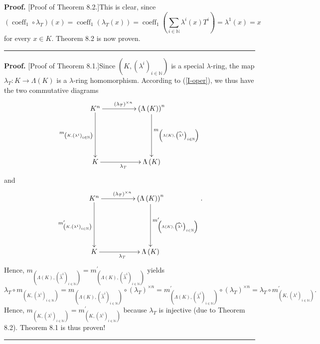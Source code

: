 \documentclass[numbers=enddot,12pt,final,onecolumn,notitlepage]{scrartcl}%
\newenvironment{proof}[1][Proof]{\noindent\textbf{#1.} }{\ \rule{0.5em}{0.5em}}
\begin{document}
\begin{proof}
[Proof of Theorem 8.2.]This is clear, since
\[
\left(  \operatorname*{coeff}\nolimits_{1}\circ\lambda_{T}\right)  \left(
x\right)  =\operatorname*{coeff}\nolimits_{1}\left(  \lambda_{T}\left(
x\right)  \right)  =\operatorname*{coeff}\nolimits_{1}\left(  \sum
\limits_{i\in\mathbb{N}}\lambda^{i}\left(  x\right)  T^{i}\right)
=\lambda^{1}\left(  x\right)  =x
\]
for every $x\in K$. Theorem 8.2 is now proven.
\end{proof}

\begin{proof}
[Proof of Theorem 8.1.]Since $\left(  K,\left(  \lambda^{i}\right)
_{i\in\mathbb{N}}\right)  $ is a special $\lambda$-ring, the map $\lambda
_{T}:K\rightarrow\Lambda\left(  K\right)  $ is a $\lambda$-ring homomorphism.
According to (\ref{I-oper}), we thus have the two commutative diagrams%
\[
\xymatrixrowsep{5pc}\xymatrixcolsep{4pc}\xymatrix{
K^n \ar[r]^{\left(\lambda_T\right)^{\times n}} \ar[d]_{m_{\left(K,\left(\lambda^i\right)_{i\in\mathbb{N}}\right)}} & \left(\Lambda\left(K\right)\right)^n \ar[d]^{m_{\left(\Lambda\left(K\right),\left(\widehat{\lambda}^i\right)_{i\in\mathbb{N}}\right)}} \\
K \ar[r]_{\lambda_T} & \Lambda\left(K\right)
}
\]
and%
\[
\xymatrixrowsep{5pc}\xymatrixcolsep{4pc}\xymatrix{
K^n \ar[r]^{\left(\lambda_T\right)^{\times n}} \ar[d]_{m^{\prime}_{\left(K,\left(\lambda^i\right)_{i\in\mathbb{N}}\right)}} & \left(\Lambda\left(K\right)\right)^n \ar[d]^{m^{\prime}_{\left(\Lambda\left(K\right),\left(\widehat{\lambda}^i\right)_{i\in\mathbb{N}}\right)}} \\
K \ar[r]_{\lambda_T} & \Lambda\left(K\right)
}.
\]
Hence, $m_{\left(  \Lambda\left(  K\right)  ,\left(  \widehat{\lambda}%
^{i}\right)  _{i\in\mathbb{N}}\right)  }=m_{\left(  \Lambda\left(  K\right)
,\left(  \widehat{\lambda}^{i}\right)  _{i\in\mathbb{N}}\right)  }^{\prime}$
yields%
\[
\lambda_{T}\circ m_{\left(  K,\left(  \lambda^{i}\right)  _{i\in\mathbb{N}%
}\right)  }=m_{\left(  \Lambda\left(  K\right)  ,\left(  \widehat{\lambda}%
^{i}\right)  _{i\in\mathbb{N}}\right)  }\circ\left(  \lambda_{T}\right)
^{\times n}=m_{\left(  \Lambda\left(  K\right)  ,\left(  \widehat{\lambda}%
^{i}\right)  _{i\in\mathbb{N}}\right)  }^{\prime}\circ\left(  \lambda
_{T}\right)  ^{\times n}=\lambda_{T}\circ m_{\left(  K,\left(  \lambda
^{i}\right)  _{i\in\mathbb{N}}\right)  }^{\prime}.
\]
Hence, $m_{\left(  K,\left(  \lambda^{i}\right)  _{i\in\mathbb{N}}\right)
}=m_{\left(  K,\left(  \lambda^{i}\right)  _{i\in\mathbb{N}}\right)  }%
^{\prime}$ because $\lambda_{T}$ is injective (due to Theorem 8.2). Theorem
8.1 is thus proven!
\end{proof}
\end{document}
